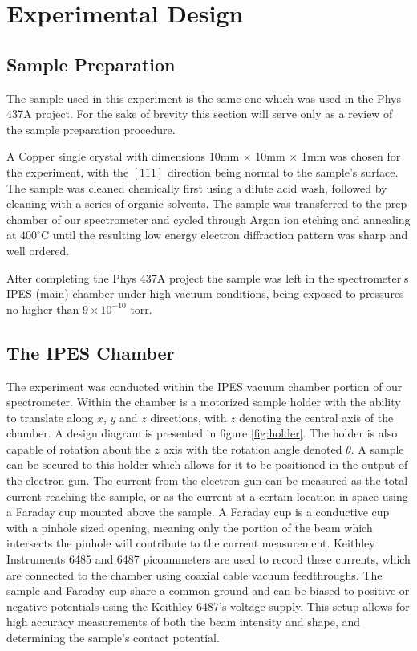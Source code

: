 \section{Experimental Design}

\subsection{Sample Preparation}

The sample used in this experiment is the same one which was used in the Phys 437A project. For the sake of brevity this section will serve only as a review of the sample preparation procedure. 

A Copper single crystal with dimensions 10mm $\times$ 10mm $\times$ 1mm was chosen for the experiment, with the $[111]$ direction being normal to the sample's surface. The sample was 
cleaned chemically first using a dilute acid wash, followed by cleaning with a series of organic solvents. The sample was transferred to the prep chamber of our spectrometer and 
cycled through Argon ion etching and annealing at $400^\circ$C\cite{robinson2012argon} until the resulting low energy electron diffraction pattern was sharp and well ordered. 

After completing the Phys 437A project the sample was left in the spectrometer's IPES (main) chamber under high vacuum conditions, being exposed to pressures no higher than $9\times10^{-10}$ torr.


\subsection{The IPES Chamber}

The experiment was conducted within the IPES vacuum chamber portion of our spectrometer. Within the chamber is a motorized sample holder with the ability to translate along $x$, $y$ and $z$ 
directions, with $z$ denoting the central axis of the chamber. A design diagram is presented in figure \ref{fig:holder}. The holder is also capable of rotation about the $z$ axis with the rotation angle denoted $\theta$. A sample can be
secured to this holder which allows for it to be positioned in the output of the electron gun. The current from the electron gun can be measured as the total current reaching the 
sample, or as the current at a certain location in space using a Faraday cup mounted above the sample. A Faraday cup is a conductive cup with a pinhole sized opening, meaning only the portion 
of the beam which intersects the pinhole will contribute to the current measurement. Keithley Instruments 6485 and 6487 picoammeters are used to record these currents, which are connected to 
the chamber using coaxial cable vacuum feedthroughs. The sample and Faraday cup share a common ground and can be biased to positive or negative potentials using the Keithley 6487's
voltage supply. This setup allows for high accuracy measurements of both the beam intensity and shape, and determining the sample's contact potential.

